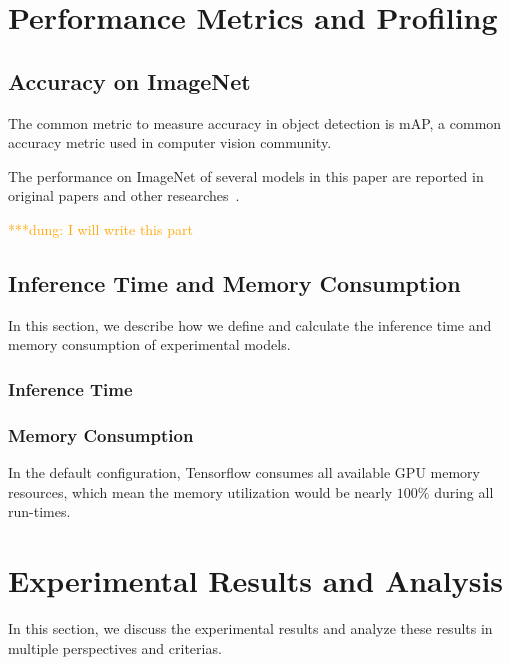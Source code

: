 \documentclass[conference]{IEEEtran}
\newcommand{\dungnote}[1]{ {\textcolor{orange} { ***dung: #1 }}}
\newcommand{\dungnote}[1]{}
\begin{document}
\section{Performance Metrics and Profiling}

\subsection{Accuracy on ImageNet}
The common metric to measure accuracy in object detection is mAP, a common accuracy metric used in computer vision community.

The performance on ImageNet of several models in this paper are reported in original papers and other researches~\cite{huang2017speed}.

\dungnote{I will write this part}

\subsection{Inference Time and Memory Consumption}
In this section, we describe how we define and calculate the inference time and memory consumption of experimental models.



\subsubsection{Inference Time}

\subsubsection{Memory Consumption}
In the default configuration, Tensorflow consumes all available GPU memory resources, which mean the memory utilization would be nearly $100\%$ during all run-times.


\section{Experimental Results and Analysis}


In this section, we discuss the experimental results and analyze these results in multiple perspectives and criterias.
\end{document}
